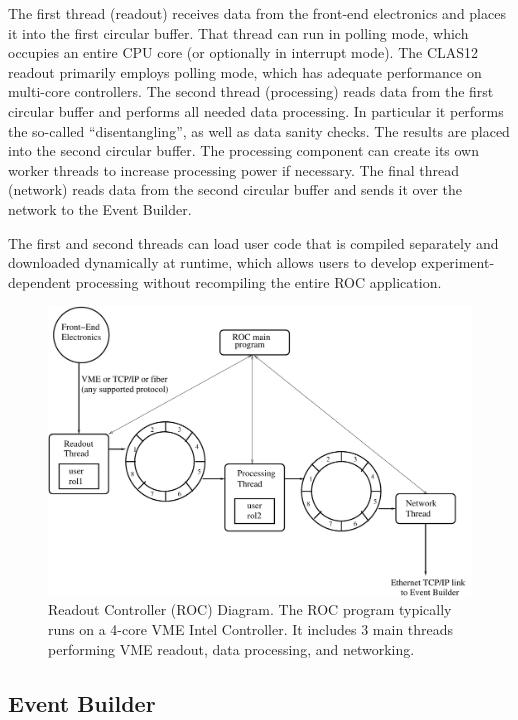 The first thread (readout) receives data from the front-end electronics and places it into the first circular buffer. That
thread can run in polling mode, which occupies an entire CPU core (or optionally in interrupt mode). The CLAS12 readout
primarily employs polling mode, which has adequate performance on multi-core controllers. The second thread (processing)
reads data from the first circular buffer and performs all needed data processing. In particular it performs the so-called
``disentangling'', as well as data sanity checks. The results are placed into the second circular buffer. The processing
component can create its own worker threads to increase processing power if necessary. The final thread (network) reads
data from the second circular buffer and sends it over the network to the Event Builder.

The first and second threads can load user code that is compiled separately and downloaded dynamically at runtime, which
allows users to develop experiment-dependent processing without recompiling the entire ROC application.

\begin{figure}[hbt]
	\centering
	\includegraphics[width=1.0\columnwidth,keepaspectratio]{img/roc_diagram.pdf}
	\caption{Readout Controller (ROC) Diagram. The ROC program typically runs on a 4-core VME Intel Controller. It
          includes 3 main threads performing  VME readout, data processing, and networking.}
	\label{fig:roc_diagram}
\end{figure}

\subsection{Event Builder}

